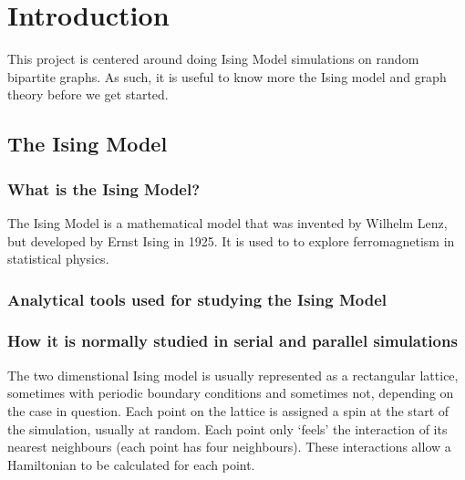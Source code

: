 \documentclass[pdftex,12pt,a4paper]{article}
\begin{document}

\tableofcontents

\newpage
{}



\section{Introduction}

This project is centered around doing Ising Model simulations on random bipartite graphs. As such, it is useful to know more the Ising model and graph theory before we get started.


\subsection{The Ising Model}



\subsubsection{What is the Ising Model?}

The Ising Model is a mathematical model that was invented by Wilhelm Lenz, but developed by Ernst Ising in 1925. It is used to to explore ferromagnetism in statistical physics.



\subsubsection{Analytical tools used for studying the Ising Model}



\subsubsection{How it is normally studied in serial and parallel simulations}

The two dimenstional Ising model is usually represented as a rectangular lattice, sometimes with periodic boundary conditions and sometimes not, depending on the case in question. Each point on the lattice is assigned a spin at the start of the simulation, usually at random. Each point only `feels' the interaction of its nearest neighbours (each point has four neighbours). These interactions allow a Hamiltonian to be calculated for each point.
\end{document}
